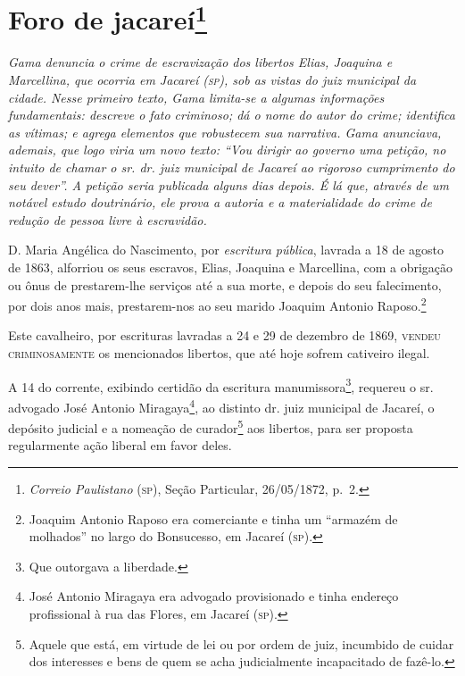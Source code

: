 \chapter{Foro de jacareí\footnote{\emph{Correio Paulistano} (\textsc{sp}), Seção Particular,
  26/05/1872, p.~2.}} %

\begin{didascalia}
\emph{Gama denuncia o crime de escravização dos libertos Elias, Joaquina
e Marcellina, que ocorria em Jacareí (\textsc{sp}), sob as vistas do juiz
municipal da cidade. Nesse primeiro texto, Gama limita-se a algumas
informações fundamentais: descreve o fato criminoso; dá o nome do autor
do crime; identifica as vítimas; e agrega elementos que robustecem sua
narrativa. Gama anunciava, ademais, que logo viria um novo texto: ``Vou
dirigir ao governo uma petição, no intuito de chamar o sr. dr. juiz
municipal de Jacareí ao rigoroso cumprimento do seu dever''. A petição
seria publicada alguns dias depois. É lá que, através de um notável
estudo doutrinário, ele prova a autoria e a materialidade do crime de
redução de pessoa livre à escravidão.}
\end{didascalia}

D. Maria Angélica do Nascimento, por \emph{escritura pública}, lavrada a
18 de agosto de 1863, alforriou os seus escravos, Elias, Joaquina e
Marcellina, com a obrigação ou ônus de prestarem-lhe serviços até a sua
morte, e depois do seu falecimento, por dois anos mais, prestarem-nos ao
seu marido Joaquim Antonio Raposo.\footnote{ Joaquim Antonio Raposo era
  comerciante e tinha um ``armazém de molhados'' no largo do Bonsucesso,
  em Jacareí (\textsc{sp}).}

Este cavalheiro, por escrituras lavradas a 24 e 29 de dezembro de 1869,
\textsc{vendeu} \textsc{criminosamente} os mencionados libertos, que até hoje sofrem
cativeiro ilegal.

A 14 do corrente, exibindo certidão da escritura manumissora\footnote{
  Que outorgava a liberdade.}, requereu o sr. advogado José Antonio
Miragaya\footnote{ José Antonio Miragaya era advogado provisionado e
  tinha endereço profissional à rua das Flores, em Jacareí (\textsc{sp}).}, ao
distinto dr. juiz municipal de Jacareí, o depósito judicial e a nomeação
de curador\footnote{ Aquele que está, em virtude de lei ou por ordem de
  juiz, incumbido de cuidar dos interesses e bens de quem se acha
  judicialmente incapacitado de fazê-lo.} aos libertos, para ser
proposta regularmente ação liberal em favor deles.

